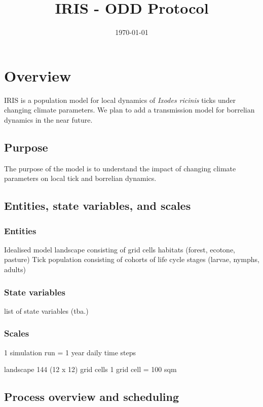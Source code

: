 \documentclass[a4paper, 11pt]{scrartcl}
\title{IRIS - ODD Protocol}
\author{}
\date{\today}
\begin{document}
	

\maketitle
\tableofcontents

\section{Overview}
IRIS is a population model for local dynamics of \textit{Ixodes ricinis} ticks under changing climate parameters.
We plan to add a transmission model for borrelian dynamics in the near future.


\subsection{Purpose}
The purpose of the model is to understand the impact of changing climate parameters on local tick and borrelian dynamics. 


\subsection{Entities, state variables, and scales}

\subsubsection{Entities}
Idealised model landscape consisting of grid cells 
habitats (forest, ecotone, pasture)
Tick population consisting of cohorts of life cycle stages (larvae, nymphs, adults)


\subsubsection{State variables}

list of state variables (tba.)


\subsubsection{Scales}
1 simulation run = 1 year 
daily time steps

landscape 144 (12 x 12) grid cells
1 grid cell = 100 sqm 


\subsection{Process overview and scheduling}
\end{document}
